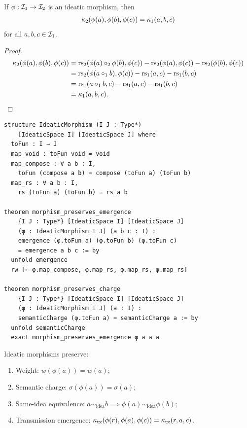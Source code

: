 \begin{proposition}
If $\phi : \mathcal{I}_1 \to \mathcal{I}_2$ is an ideatic morphism, then
\[
    \kappa_2(\phi(a), \phi(b), \phi(c)) = \kappa_1(a, b, c)
\]
for all $a, b, c \in \mathcal{I}_1$.
\end{proposition}
\begin{proof}
\begin{align*}
    \kappa_2(\phi(a), \phi(b), \phi(c))
    &= \mathrm{rs}_2(\phi(a) \circ_2 \phi(b), \phi(c))
       - \mathrm{rs}_2(\phi(a), \phi(c)) - \mathrm{rs}_2(\phi(b), \phi(c)) \\
    &= \mathrm{rs}_2(\phi(a \circ_1 b), \phi(c))
       - \mathrm{rs}_1(a, c) - \mathrm{rs}_1(b, c) \\
    &= \mathrm{rs}_1(a \circ_1 b, c) - \mathrm{rs}_1(a, c) - \mathrm{rs}_1(b, c) \\
    &= \kappa_1(a, b, c).
\end{align*}
\end{proof}

\begin{lstlisting}[language=Lean4, caption={Ideatic morphism in Lean 4}]
structure IdeaticMorphism (I J : Type*)
    [IdeaticSpace I] [IdeaticSpace J] where
  toFun : I → J
  map_void : toFun void = void
  map_compose : ∀ a b : I,
    toFun (compose a b) = compose (toFun a) (toFun b)
  map_rs : ∀ a b : I,
    rs (toFun a) (toFun b) = rs a b

theorem morphism_preserves_emergence
    {I J : Type*} [IdeaticSpace I] [IdeaticSpace J]
    (φ : IdeaticMorphism I J) (a b c : I) :
    emergence (φ.toFun a) (φ.toFun b) (φ.toFun c)
    = emergence a b c := by
  unfold emergence
  rw [← φ.map_compose, φ.map_rs, φ.map_rs, φ.map_rs]

theorem morphism_preserves_charge
    {I J : Type*} [IdeaticSpace I] [IdeaticSpace J]
    (φ : IdeaticMorphism I J) (a : I) :
    semanticCharge (φ.toFun a) = semanticCharge a := by
  unfold semanticCharge
  exact morphism_preserves_emergence φ a a a
\end{lstlisting}

\begin{corollary}
Ideatic morphisms preserve:
\begin{enumerate}
    \item Weight: $w(\phi(a)) = w(a)$;
    \item Semantic charge: $\sigma(\phi(a)) = \sigma(a)$;
    \item Same-idea equivalence: $a \sim_{\mathrm{idea}} b \implies
          \phi(a) \sim_{\mathrm{idea}} \phi(b)$;
    \item Transmission emergence: $\kappa_{\mathrm{tx}}(\phi(r),
          \phi(a), \phi(c)) = \kappa_{\mathrm{tx}}(r, a, c)$.
\end{enumerate}
\end{corollary}

